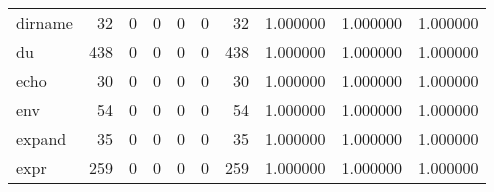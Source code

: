 \begin{tabular}{lrrrrrrrrr}
dirname   &                                        32 &                                                  0 &                                                  0 &                                                  0 &                                                  0 &                                                 32 &                                           1.000000 &                               1.000000 &                             1.000000 \\
du        &                                       438 &                                                  0 &                                                  0 &                                                  0 &                                                  0 &                                                438 &                                           1.000000 &                               1.000000 &                             1.000000 \\
echo      &                                        30 &                                                  0 &                                                  0 &                                                  0 &                                                  0 &                                                 30 &                                           1.000000 &                               1.000000 &                             1.000000 \\
env       &                                        54 &                                                  0 &                                                  0 &                                                  0 &                                                  0 &                                                 54 &                                           1.000000 &                               1.000000 &                             1.000000 \\
expand    &                                        35 &                                                  0 &                                                  0 &                                                  0 &                                                  0 &                                                 35 &                                           1.000000 &                               1.000000 &                             1.000000 \\
expr      &                                       259 &                                                  0 &                                                  0 &                                                  0 &                                                  0 &                                                259 &                                           1.000000 &                               1.000000 &                             1.000000 \\

\end{tabular}

